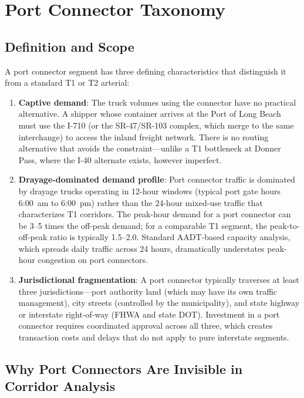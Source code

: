 \section{Port Connector Taxonomy}
\label{sec:taxonomy}

\subsection{Definition and Scope}

A port connector segment has three defining characteristics that distinguish it from a standard T1 or T2 arterial:

\begin{enumerate}
  \item \textbf{Captive demand}: The truck volumes using the connector have no practical alternative. A shipper whose container arrives at the Port of Long Beach must use the I-710 (or the SR-47/SR-103 complex, which merge to the same interchange) to access the inland freight network. There is no routing alternative that avoids the constraint---unlike a T1 bottleneck at Donner Pass, where the I-40 alternate exists, however imperfect.

  \item \textbf{Drayage-dominated demand profile}: Port connector traffic is dominated by drayage trucks operating in 12-hour windows (typical port gate hours 6:00~am to 6:00~pm) rather than the 24-hour mixed-use traffic that characterizes T1 corridors. The peak-hour demand for a port connector can be 3--5 times the off-peak demand; for a comparable T1 segment, the peak-to-off-peak ratio is typically 1.5--2.0. Standard AADT-based capacity analysis, which spreads daily traffic across 24 hours, dramatically understates peak-hour congestion on port connectors.

  \item \textbf{Jurisdictional fragmentation}: A port connector typically traverses at least three jurisdictions---port authority land (which may have its own traffic management), city streets (controlled by the municipality), and state highway or interstate right-of-way (FHWA and state DOT). Investment in a port connector requires coordinated approval across all three, which creates transaction costs and delays that do not apply to pure interstate segments.
\end{enumerate}

\subsection{Why Port Connectors Are Invisible in Corridor Analysis}

